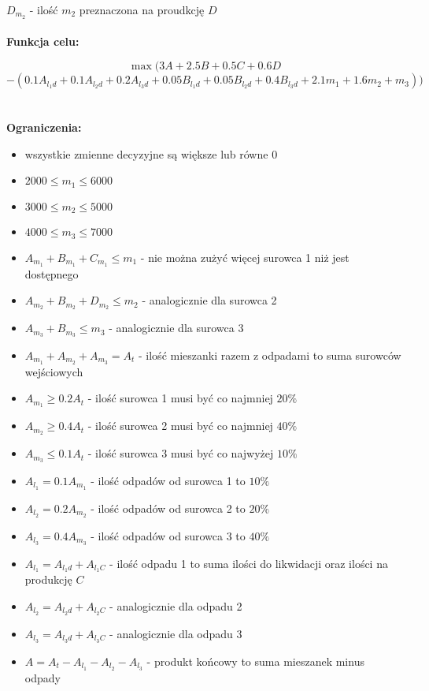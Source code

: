\documentclass[12pt, a4paper]{article}
\begin{document}
$D_{m_2}$ - ilość $m_2$ preznaczona na proudkcję $D$
\\
\\
\textbf{Funkcja celu:}

\[\max (3A + 2.5B + 0.5C + 0.6D\]
\[- (0.1A_{l_1d} + 0.1A_{l_2d} + 0.2A_{l_3d} + 0.05B_{l_1d} + 0.05B_{l_2d} + 0.4B_{l_3d} + 2.1m_1 + 1.6m_2 + m_3))\]
\\
\\
\textbf{Ograniczenia:}

\begin{itemize}
  \item wszystkie zmienne decyzyjne są większe lub równe 0
  \item $2000 \leq m_1 \leq 6000$
  \item $3000 \leq m_2 \leq 5000$
  \item $4000 \leq m_3 \leq 7000$
  \item $A_{m_1} + B_{m_1} + C_{m_1} \leq m_1$ - nie można zużyć więcej surowca 1 niż jest dostępnego
  \item $A_{m_2} + B_{m_2} + D_{m_2} \leq m_2$ - analogicznie dla surowca 2
  \item $A_{m_3} + B_{m_3} \leq m_3$ - analogicznie dla surowca 3
  \item $A_{m_1} + A_{m_2} + A_{m_3} = A_t$ - ilość mieszanki razem z odpadami to suma surowców wejściowych
  \item $A_{m_1} \geq 0.2A_t$ - ilość surowca 1 musi być co najmniej $20\%$
  \item $A_{m_2} \geq 0.4A_t$ - ilość surowca 2 musi być co najmniej $40\%$
  \item $A_{m_3} \leq 0.1A_t$ - ilość surowca 3 musi być co najwyżej $10\%$
  \item $A_{l_1} = 0.1A_{m_1}$ - ilość odpadów od surowca 1 to $10\%$
  \item $A_{l_2} = 0.2A_{m_2}$ - ilość odpadów od surowca 2 to $20\%$
  \item $A_{l_3} = 0.4A_{m_3}$ - ilość odpadów od surowca 3 to $40\%$
  \item $A_{l_1} = A_{l_1d} + A_{l_1C}$ - ilość odpadu 1 to suma ilości do likwidacji oraz ilości na produkcję $C$ 
  \item $A_{l_2} = A_{l_2d} + A_{l_2C}$ - analogicznie dla odpadu 2
  \item $A_{l_3} = A_{l_3d} + A_{l_3C}$ - analogicznie dla odpadu 3
  \item $A = A_t - A_{l_1} - A_{l_2} - A_{l_3}$ - produkt końcowy to suma mieszanek minus odpady


\end{itemize}
\end{document}
